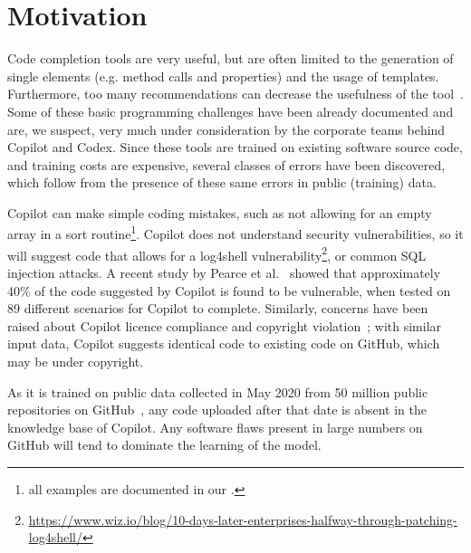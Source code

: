 \section{Motivation}
\label{challenges}
Code completion tools are very useful, but are often limited to the generation of single elements (e.g. method calls and properties) and the usage of templates. Furthermore, too many recommendations can decrease the usefulness of the tool~\cite{Proksch2015}. 
Some of these basic programming challenges have been already documented and are, we suspect, very much under consideration by the corporate teams behind Copilot and Codex. Since these tools are trained on existing software source code, and training costs are expensive, several classes of errors have been discovered, which follow from the presence of these same errors in public (training) data.

Copilot can make simple coding mistakes, such as not allowing for an empty array in a sort routine\footnote{all examples are documented in our \repl{}.}. Copilot does not understand security vulnerabilities, so it will suggest code that allows for a \textsf{log4shell} vulnerability\footnote{\url{https://www.wiz.io/blog/10-days-later-enterprises-halfway-through-patching-log4shell/}}, or common SQL injection attacks. A recent study by Pearce et al.~\cite{copilot_security} showed that approximately 40\% of the code suggested by Copilot is found to be vulnerable, when tested on 89 different scenarios for Copilot to complete.
Similarly, concerns have been raised about Copilot licence compliance and copyright violation~\cite{code_clone}; with similar input data, Copilot suggests identical code to existing code on GitHub, which may be under copyright. 

As it is trained on public data collected in May 2020 from 50 million public repositories on GitHub~\cite{copilot}, any code uploaded after that date is absent in the knowledge base of Copilot. 
Any software flaws present in large numbers on GitHub will tend to dominate the learning of the model.

